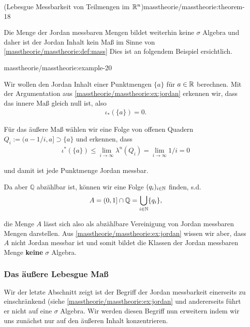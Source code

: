 \begin{theorem}{(Lebesgue Messbarkeit von Teilmengen im \protect\(\mathbb{R}^n\protect\))}{masstheorie/masstheorie:theorem-18}
\par
Die Menge der Jordan messbaren Mengen bildet weiterhin keine \(\sigma\) Algebra und daher ist der Jordan Inhalt kein Maß im Sinne von \cref{masstheorie/masstheorie:def:mass}  Dies ist an folgendem Beispiel ersichtlich.
\begin{example}{}{masstheorie/masstheorie:example-20}



\par
Wir wollen den Jordan Inhalt einer Punktmengen \(\{a\}\) für \(a\in\mathbb{R}\) berechnen. Mit der Argumentation aus \cref{masstheorie/masstheorie:ex:jordan} erkennen wir, dass das innere Maß gleich null ist, also
\begin{align*}
\iota_\ast(\{a\}) = 0.
\end{align*}
\par
Für das äußere Maß wählen wir eine Folge von offenen Quadern \(Q_i:= (a-1/i, a] \supset \{a\}\) und erkennen, dass
\begin{align*}
\iota^\ast(\{a\})\leq \lim_{i\to\infty} \lambda^n(Q_i) = \lim_{i\to\infty} 1/i = 0
\end{align*}
\par
und damit ist jede Punktmenge Jordan messbar.

\par
Da aber \(\mathbb{Q}\) abzählbar ist, können wir eine Folge \((q_i)_{i\in\mathbb{N}}\) finden, s.d.
\begin{align*}
A = (0,1]\cap \mathbb{Q} = \bigcup_{i\in\mathbb{N}} \{q_i\},
\end{align*}
\par
die Menge \(A\) lässt sich also als abzählbare Vereinigung von Jordan messbaren Mengen darstellen. Aus \cref{masstheorie/masstheorie:ex:jordan} wissen wir aber, dass \(A\) nicht Jordan messbar ist und somit bildet die Klassen der Jordan messbaren Menge \textbf{keine} \(\sigma\) Algebra.
\end{example}


\subsubsection{Das äußere Lebesgue Maß}
\label{\detokenize{masstheorie/masstheorie:das-auszere-lebesgue-masz}}
\par
Wir der letzte Abschnitt zeigt ist der Begriff der Jordan messbarkeit einerseits zu einschränkend (siehe \cref{masstheorie/masstheorie:ex:jordan}  und andererseits führt er nicht auf eine \(\sigma\) Algebra. Wir werden diesen Begriff nun erweitern indem wir uns zunächst nur auf den äußeren Inhalt konzentrieren.


\end{theorem}
